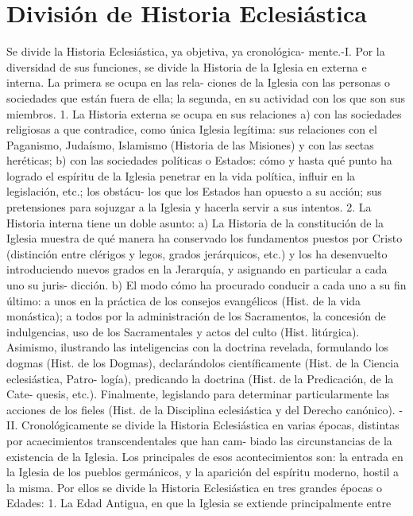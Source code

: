 \raggedbottom{} \documentclass[12pt]{book}
\begin{document}
\section{División de Historia Eclesiástica}
Se divide la Historia Eclesiástica, ya objetiva, ya cronológica-
mente.-I. Por la diversidad de sus funciones, se divide la Historia
de la Iglesia en externa e interna. La primera se ocupa en las rela-
ciones de la Iglesia con las personas o sociedades que están fuera de
ella; la segunda, en su actividad con los que son sus miembros.
1. La Historia externa se ocupa en sus relaciones a) con las
sociedades religiosas a que contradice, como única Iglesia legítima:
sus relaciones con el Paganismo, Judaísmo, Islamismo (Historia de las
Misiones) y con las sectas heréticas; b) con las sociedades políticas o
Estados: cómo y hasta qué punto ha logrado el espíritu de la Iglesia
penetrar en la vida política, influir en la legislación, etc.; los obstácu-
los que los Estados han opuesto a su acción; sus pretensiones para
sojuzgar a la Iglesia y hacerla servir a sus intentos.
2. La Historia interna tiene un doble asunto: a) La Historia de
la constitución de la Iglesia muestra de qué manera ha conservado los
fundamentos puestos por Cristo (distinción entre clérigos y legos,
grados jerárquicos, etc.) y los ha desenvuelto introduciendo nuevos
grados en la Jerarquía, y asignando en particular a cada uno su juris-
dicción. b) El modo cómo ha procurado conducir a cada uno a su fin
último: a unos en la práctica de los consejos evangélicos (Hist. de
la vida monástica); a todos por la administración de los Sacramentos,
la concesión de indulgencias, uso de los Sacramentales y actos del
culto (Hist. litúrgica). Asimismo, ilustrando las inteligencias con la
doctrina revelada, formulando los dogmas (Hist. de los Dogmas),
declarándolos científicamente (Hist. de la Ciencia eclesiástica, Patro-
logía), predicando la doctrina (Hist. de la Predicación, de la Cate-
quesis, etc.). Finalmente, legislando para determinar particularmente
las acciones de los fieles (Hist. de la Disciplina eclesiástica y del
Derecho canónico).
- II. Cronológicamente se divide la Historia Eclesiástica en varias
épocas, distintas por acaecimientos transcendentales que han cam-
biado las circunstancias de la existencia de la Iglesia. Los principales
de esos acontecimientos son: la entrada en la Iglesia de los pueblos
germánicos, y la aparición del espíritu moderno, hostil a la misma.
Por ellos se divide la Historia Eclesiástica en tres grandes épocas
o Edades:
1. La Edad Antigua, en que la Iglesia se extiende principalmente entre
\end{document}
